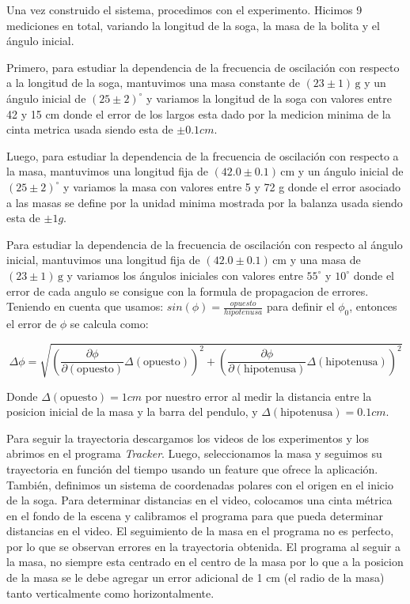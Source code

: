 \documentclass[12pt,a4]{article}
\begin{document}
Una vez construido el sistema, procedimos con el experimento. Hicimos 9 mediciones en total, variando la longitud de la soga, la masa de la bolita y el ángulo inicial.

Primero, para estudiar la dependencia de la frecuencia de oscilación con respecto a la longitud de la soga, mantuvimos una masa constante de $(23 \pm 1) \, \text{g}$ y un ángulo inicial de $(25 \pm 2)^\circ$ y variamos la longitud de la soga con valores entre 
42 y 15 cm donde el error de los largos esta dado por la medicion minima de la cinta metrica usada siendo esta de $\pm 0.1 cm$.

Luego, para estudiar la dependencia de la frecuencia de oscilación con respecto a la masa, mantuvimos una longitud fija de $(42.0 \pm 0.1) \, \text{cm}$ y un ángulo inicial de $(25 \pm 2)^\circ$ y variamos la masa con valores entre 
5 y 72 g donde el error asociado a las masas se define por la unidad minima mostrada por la balanza usada siendo esta de $\pm 1 g$.

Para estudiar la dependencia de la frecuencia de oscilación con respecto al ángulo inicial, mantuvimos una longitud fija de $(42.0 \pm 0.1) \, \text{cm}$ y una masa de $(23 \pm 1) \, \text{g}$ y variamos los ángulos iniciales con valores entre 
$55^\circ$ y $10^\circ$ donde el error de cada angulo se consigue con la formula de propagacion de errores. 
Teniendo en cuenta que usamos: $sin(\phi) = \frac{opuesto}{hipotenusa}$ para definir el $\phi_0$, entonces el error de $\phi$ se calcula como:

\begin{equation}
    \Delta \phi = \sqrt{\left( \frac{\partial \phi}{\partial (\text{opuesto})} \Delta (\text{opuesto}) \right)^2 + \left( \frac{\partial \phi}{\partial (\text{hipotenusa})} \Delta (\text{hipotenusa}) \right)^2}
\end{equation}

Donde $\Delta (\text{opuesto}) = 1 cm$ por nuestro error al medir la distancia entre la posicion inicial de la masa y la barra del pendulo,
 y $\Delta (\text{hipotenusa}) = 0.1 cm$.

Para seguir la trayectoria descargamos los videos de los experimentos y los abrimos en el programa \textit{Tracker}. 
Luego, seleccionamos la masa y seguimos su trayectoria en función del tiempo usando un feature que ofrece la aplicación. 
También, definimos un sistema de coordenadas polares con el origen en el inicio de la soga. 
Para determinar distancias en el video, colocamos una cinta métrica en el fondo de la escena y calibramos el programa para que pueda determinar distancias en el video. 
El seguimiento de la masa en el programa no es perfecto, por lo que se observan errores en la trayectoria obtenida.
El programa al seguir a la masa, no siempre esta centrado en el centro de la masa por lo que a la posicion de la masa se le debe agregar un error adicional de 1 cm (el radio de la masa) tanto verticalmente como horizontalmente.
\end{document}

